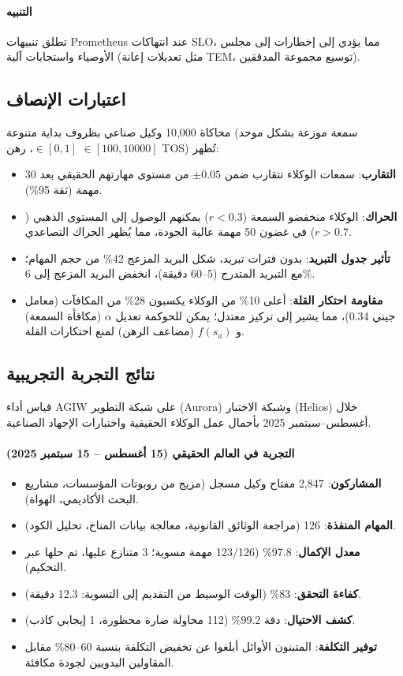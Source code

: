 \documentclass[11pt]{article}
\begin{document}
\paragraph{التنبيه} تطلق تنبيهات Prometheus عند انتهاكات SLO، مما يؤدي إلى إخطارات إلى مجلس الأوصياء واستجابات آلية (مثل تعديلات إعانة TEM، توسيع مجموعة المدققين).

\subsection{اعتبارات الإنصاف}
محاكاة 10,000 وكيل صناعي بظروف بداية متنوعة (سمعة موزعة بشكل موحد $\in [0,1]$، رهن $\in [100, 10000]$ TOS) تُظهر:
\begin{itemize}[noitemsep]
  \item \textbf{التقارب}: سمعات الوكلاء تتقارب ضمن $\pm0.05$ من مستوى مهارتهم الحقيقي بعد 30 مهمة (ثقة 95\%).
  \item \textbf{الحراك}: الوكلاء منخفضو السمعة ($r<0.3$) يمكنهم الوصول إلى المستوى الذهبي ($r>0.7$) في غضون 50 مهمة عالية الجودة، مما يُظهر الحراك التصاعدي.
  \item \textbf{تأثير جدول التبريد}: بدون فترات تبريد، شكل البريد المزعج 42\% من حجم المهام؛ مع التبريد المتدرج (5--60 دقيقة)، انخفض البريد المزعج إلى 6\%.
  \item \textbf{مقاومة احتكار القلة}: أعلى 10\% من الوكلاء يكسبون 28\% من المكافآت (معامل جيني 0.34)، مما يشير إلى تركيز معتدل؛ يمكن للحوكمة تعديل $\alpha$ (مكافأة السمعة) و $f(s_a)$ (مضاعف الرهن) لمنع احتكارات القلة.
\end{itemize}

\subsection{نتائج التجربة التجريبية}
\label{sec:pilot-results}
قياس أداء AGIW على شبكة التطوير (Aurora) وشبكة الاختبار (Helios) خلال أغسطس--سبتمبر 2025 بأحمال عمل الوكلاء الحقيقية واختبارات الإجهاد الصناعية.

\paragraph{التجربة في العالم الحقيقي (15 أغسطس -- 15 سبتمبر 2025)}
\begin{itemize}[noitemsep]
  \item \textbf{المشاركون}: 2,847 مفتاح وكيل مسجل (مزيج من روبوتات المؤسسات، مشاريع البحث الأكاديمي، الهواة).
  \item \textbf{المهام المنفذة}: 126 (مراجعة الوثائق القانونية، معالجة بيانات المناخ، تحليل الكود).
  \item \textbf{معدل الإكمال}: 97.8\% (123/126 مهمة مسوية؛ 3 متنازع عليها، تم حلها عبر التحكيم).
  \item \textbf{كفاءة التحقق}: 83\% (الوقت الوسيط من التقديم إلى التسوية: 12.3 دقيقة).
  \item \textbf{كشف الاحتيال}: دقة 99.2\% (112 محاولة ضارة محظورة، 1 إيجابي كاذب).
  \item \textbf{توفير التكلفة}: المتبنون الأوائل أبلغوا عن تخفيض التكلفة بنسبة 60--80\% مقابل المقاولين اليدويين لجودة مكافئة.
\end{itemize}
\end{document}
